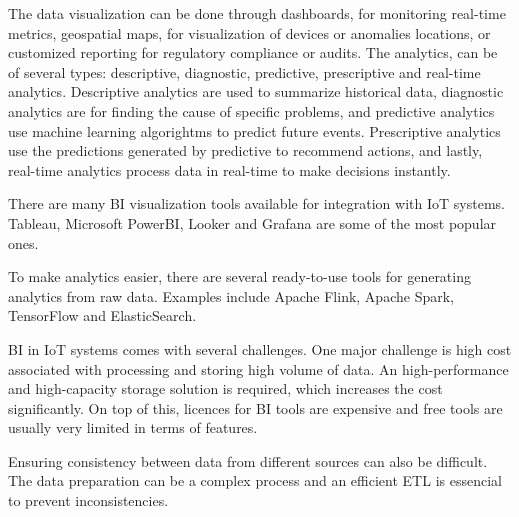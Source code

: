 The data visualization can be done through dashboards, for monitoring real-time
metrics, geospatial maps, for visualization of devices or anomalies locations,
or customized reporting for regulatory compliance or audits. The analytics, can
be of several types: descriptive, diagnostic, predictive, prescriptive and
real-time analytics. Descriptive analytics are used to summarize historical
data, diagnostic analytics are for finding the cause of specific problems, and
predictive analytics use machine learning algorightms to predict future events.
Prescriptive analytics use the predictions generated by predictive to recommend
actions, and lastly, real-time analytics process data in real-time to make
decisions instantly.

There are many \gls{BI} visualization tools available for integration with \gls{IoT} systems.
Tableau, Microsoft PowerBI, Looker and Grafana are some of the most popular ones.

To make analytics easier, there are several ready-to-use tools for generating
analytics from raw data. Examples include Apache Flink, Apache Spark,
TensorFlow and ElasticSearch.

\gls{BI} in \gls{IoT} systems comes with several challenges.
One major challenge is high cost associated with processing and storing
high volume of data. An high-performance and high-capacity storage
solution is required, which increases the cost significantly. On top of this,
licences for \gls{BI} tools are expensive and free tools are usually very
limited in terms of features.

Ensuring consistency between data from different sources can also be difficult.
The data preparation can be a complex process and an efficient \gls{ETL} is
essencial to prevent inconsistencies.




